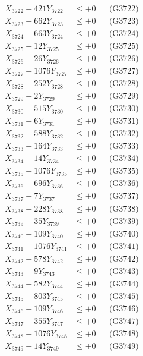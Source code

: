 \documentclass[a4paper,10pt]{article}
\begin{document}
{\begin{align}
X_{3722} - 421Y_{3722} &\leq +0 && \text{(G3722)} \\
X_{3723} - 662Y_{3723} &\leq +0 && \text{(G3723)} \\
X_{3724} - 663Y_{3724} &\leq +0 && \text{(G3724)} \\
X_{3725} - 12Y_{3725} &\leq +0 && \text{(G3725)} \\
X_{3726} - 26Y_{3726} &\leq +0 && \text{(G3726)} \\
X_{3727} - 1076Y_{3727} &\leq +0 && \text{(G3727)} \\
X_{3728} - 252Y_{3728} &\leq +0 && \text{(G3728)} \\
X_{3729} - 2Y_{3729} &\leq +0 && \text{(G3729)} \\
X_{3730} - 515Y_{3730} &\leq +0 && \text{(G3730)} \\
\allowbreak
X_{3731} - 6Y_{3731} &\leq +0 && \text{(G3731)} \\
X_{3732} - 588Y_{3732} &\leq +0 && \text{(G3732)} \\
X_{3733} - 164Y_{3733} &\leq +0 && \text{(G3733)} \\
X_{3734} - 14Y_{3734} &\leq +0 && \text{(G3734)} \\
X_{3735} - 1076Y_{3735} &\leq +0 && \text{(G3735)} \\
X_{3736} - 696Y_{3736} &\leq +0 && \text{(G3736)} \\
X_{3737} - 7Y_{3737} &\leq +0 && \text{(G3737)} \\
X_{3738} - 228Y_{3738} &\leq +0 && \text{(G3738)} \\
X_{3739} - 35Y_{3739} &\leq +0 && \text{(G3739)} \\
X_{3740} - 109Y_{3740} &\leq +0 && \text{(G3740)} \\
\allowbreak
X_{3741} - 1076Y_{3741} &\leq +0 && \text{(G3741)} \\
X_{3742} - 578Y_{3742} &\leq +0 && \text{(G3742)} \\
X_{3743} - 9Y_{3743} &\leq +0 && \text{(G3743)} \\
X_{3744} - 582Y_{3744} &\leq +0 && \text{(G3744)} \\
X_{3745} - 803Y_{3745} &\leq +0 && \text{(G3745)} \\
X_{3746} - 109Y_{3746} &\leq +0 && \text{(G3746)} \\
X_{3747} - 355Y_{3747} &\leq +0 && \text{(G3747)} \\
X_{3748} - 1076Y_{3748} &\leq +0 && \text{(G3748)} \\
X_{3749} - 14Y_{3749} &\leq +0 && \text{(G3749)} \\

\end{align}}
\end{document}
